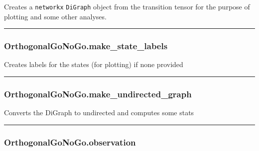 Creates a \texttt{networkx} \texttt{DiGraph} object from the transition
tensor for the purpose of plotting and some other analyses.

\begin{center}\rule{0.5\linewidth}{\linethickness}\end{center}

\subsubsection{OrthogonalGoNoGo.make\_state\_labels}\label{orthogonalgonogo.make_state_labels}

\begin{Shaded}
\begin{Highlighting}[]
\NormalTok{)}
\end{Highlighting}
\end{Shaded}

Creates labels for the states (for plotting) if none provided

\begin{center}\rule{0.5\linewidth}{\linethickness}\end{center}

\subsubsection{OrthogonalGoNoGo.make\_undirected\_graph}\label{orthogonalgonogo.make_undirected_graph}

\begin{Shaded}
\begin{Highlighting}[]
\NormalTok{)}
\end{Highlighting}
\end{Shaded}

Converts the DiGraph to undirected and computes some stats

\begin{center}\rule{0.5\linewidth}{\linethickness}\end{center}

\subsubsection{OrthogonalGoNoGo.observation}\label{orthogonalgonogo.observation}

\begin{Shaded}
\begin{Highlighting}[]
\NormalTok{)}
\end{Highlighting}
\end{Shaded}

